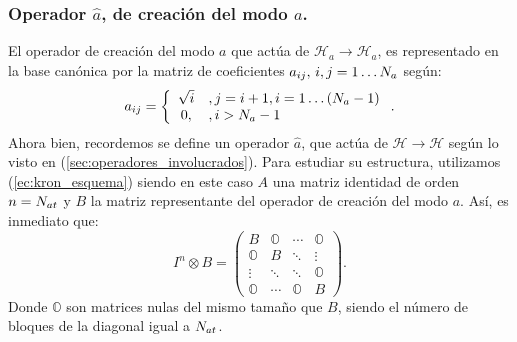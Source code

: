\subsubsection{Operador $\hat{a}$, de creaci\'on del modo $a$.}
\quad El operador de creaci\'on del modo $a$ que act\'ua de $\mathcal{H}_a\rightarrow\mathcal{H}_a$, es representado en la base can\'onica por la matriz de coeficientes $a_{ij},\,i,j=1\ldots N_a$ seg\'un:\begin{equation}\label{ec:coef_creacion_a}
a_{ij}=\left\{
\begin{array}{cl}
 \sqrt{i} & ,j=i+1,i=1 \ldots (N_a -1)\\
0, & , i>N_a-1
\end{array}
\right..
\end{equation}
\quad Ahora bien, recordemos se define un operador $\hat{a}$, que act\'ua de $\mathcal{H}\rightarrow \mathcal{H}$ seg\'un lo visto en (\ref{sec:operadores_involucrados}). Para estudiar su estructura, utilizamos (\ref{ec:kron_esquema}) siendo en este caso $A$ una matriz identidad de orden $n=N_{at}$ y $B$ la matriz representante del operador de creaci\'on del modo $a$. As\'i, es inmediato que:\begin{equation}\label{ec:IkronA}
 I^n \otimes B=
\left(\begin{array}{cccc}
B & \mathbb{O}& \cdots &\mathbb{O}\\
\mathbb{O} & B &\ddots &\vdots\\
\vdots & \ddots & \ddots & \mathbb{O}\\
\mathbb{O} &\cdots &\mathbb{O} & B
\end{array}\right).
\end{equation}
\quad Donde $\mathbb{O}$ son matrices nulas del mismo tama\~no que $B$, siendo el n\'umero de bloques de la diagonal igual a $N_{at}$.\\

